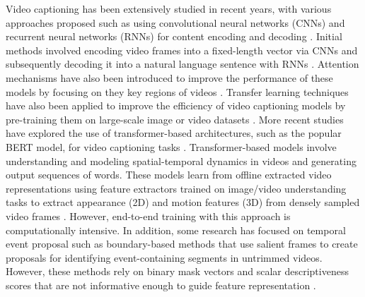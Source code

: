 Video captioning has been extensively studied in recent years, with various approaches proposed such as using convolutional neural networks (CNNs) and recurrent neural networks (RNNs) for content encoding and decoding \cite{yu2016video}. Initial methods involved encoding video frames into a fixed-length vector via CNNs and subsequently decoding it into a natural language sentence with RNNs \cite{pan2016hierarchical}. Attention mechanisms have also been introduced to improve the performance of these models by focusing on they key regions of videos \cite{zhou2018end}. Transfer learning techniques have also been applied to improve the efficiency of video captioning models by pre-training them on large-scale image or video datasets \cite{mahajan2018exploring}. More recent studies have explored the use of transformer-based architectures, such as the popular BERT model, for video captioning tasks \cite{kim2020dense}. Transformer-based models involve understanding and modeling spatial-temporal dynamics in videos and generating output sequences of words. These models learn from offline extracted video representations using feature extractors trained on image/video understanding tasks to extract appearance (2D) and motion features (3D) from densely sampled video frames \cite{Lei2021LessIM,Luo2020UniViLMAU}. However, end-to-end training with this approach is computationally intensive. In addition, some research has focused on temporal event proposal such as boundary-based methods that use salient frames to create proposals for identifying event-containing segments in untrimmed videos. However, these methods rely on binary mask vectors and scalar descriptiveness scores that are not informative enough to guide feature representation \cite{Li2018JointlyLA,Singh2022V2TVT}.